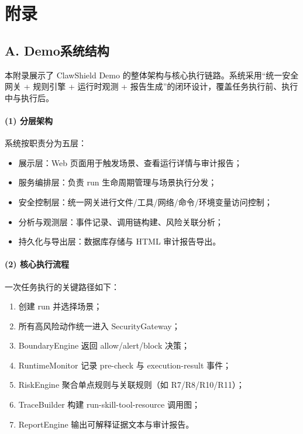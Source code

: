\chapter{附录}

\section*{A. Demo系统结构}
\label{sec:demo_architecture}

本附录展示了 ClawShield Demo 的整体架构与核心执行链路。系统采用“统一安全网关 + 规则引擎 + 运行时观测 + 报告生成”的闭环设计，覆盖任务执行前、执行中与执行后。

\subsubsection*{(1) 分层架构}
系统按职责分为五层：
\begin{itemize}
  \item 展示层：Web 页面用于触发场景、查看运行详情与审计报告；
  \item 服务编排层：负责 run 生命周期管理与场景执行分发；
  \item 安全控制层：统一网关进行文件/工具/网络/命令/环境变量访问控制；
  \item 分析与观测层：事件记录、调用链构建、风险关联分析；
  \item 持久化与导出层：数据库存储与 HTML 审计报告导出。
\end{itemize}

\subsubsection*{(2) 核心执行流程}
一次任务执行的关键路径如下：
\begin{enumerate}
  \item 创建 run 并选择场景；
  \item 所有高风险动作统一进入 SecurityGateway；
  \item BoundaryEngine 返回 allow/alert/block 决策；
  \item RuntimeMonitor 记录 pre-check 与 execution-result 事件；
  \item RiskEngine 聚合单点规则与关联规则（如 R7/R8/R10/R11）；
  \item TraceBuilder 构建 run-skill-tool-resource 调用图；
  \item ReportEngine 输出可解释证据文本与审计报告。
\end{enumerate}

